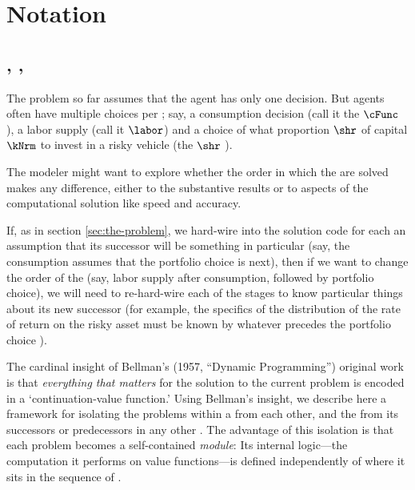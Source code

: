 \documentclass[SolvingMicroDSOPs]{subfiles}
\begin{document}
\hypertarget{notation}{}
\section{Notation}\label{sec:notation}

\subsection{\Intervals, \Stgs, \Prchs}

The problem so far assumes that the agent has only one decision.  But agents often have multiple choices per {\interval}; say, a consumption decision (call it the $\cFunc$ {\stg}), a labor supply {\stg} (call it $\labor$) and a choice of what proportion $\shr$ of capital $\kNrm$ to invest in a risky vehicle (the $\shr$ {\stg}).

The modeler might want to explore whether the order in which the {\stgs} are solved makes any difference, either to the substantive results or to aspects of the computational solution like speed and accuracy.

If, as in section \ref{sec:the-problem}, we hard-wire into the solution code for each {\stg} an assumption that its successor {\stg} will be something in particular (say, the consumption {\stg} assumes that the portfolio choice is next), then if we want to change the order of the {\stgs} (say, labor supply after consumption, followed by portfolio choice), we will need to re-hard-wire each of the stages to know particular things about its new successor (for example, the specifics of the distribution of the rate of return on the risky asset must be known by whatever {\stg} precedes the portfolio choice {\stg}).

The cardinal insight of Bellman's (1957, ``Dynamic Programming'') original work is that \emph{everything that matters} for the solution to the current problem is encoded in a `continuation-value function.' %
Using Bellman's insight, we describe here a framework for isolating the {\stg} problems within a {\interval} from each other, and the {\interval} from its successors or predecessors in any other {\interval}.  The advantage of this isolation is that each {\stg} problem becomes a self-contained \textit{module}: Its internal logic---the computation it performs on value functions---is defined independently of where it sits in the sequence of {\stgs}.
\end{document}
